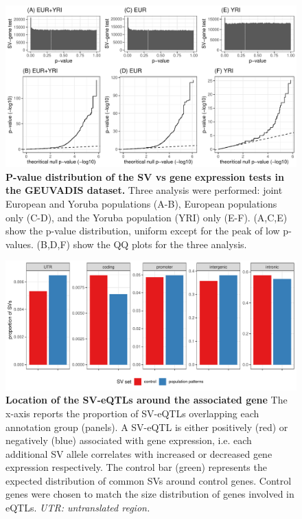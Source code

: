 \documentclass[11pt]{ucscthesis}
\begin{document}
\begin{figure}[H]
  \includegraphics[width=\linewidth]{fig-sv-eqtl.pdf}
  \caption[P-value distribution of the SV vs gene expression tests in the GEUVADIS dataset]{{\bf P-value distribution of the SV vs gene expression tests in the GEUVADIS dataset.}
    Three analysis were performed: joint European and Yoruba populations (A-B), European populations only (C-D), and the Yoruba population (YRI) only (E-F).
    (A,C,E) show the p-value distribution, uniform except for the peak of low p-values.
    (B,D,F) show the QQ plots for the three analysis.
  }
  \label{fig:eqtl_qc}
  \end{figure}

\begin{figure}[H]
  \includegraphics[width=\linewidth, page=2]{fig-sv-functional-summary.pdf}
  \caption[Location of the SV-eQTLs around the associated gene]{{\bf Location of the SV-eQTLs around the associated gene}
    The x-axis reports the proportion of SV-eQTLs overlapping each annotation group (panels).
    A SV-eQTL is either positively (red) or negatively (blue) associated with gene expression, i.e. each additional SV allele correlates with increased or decreased gene expression respectively.
    The control bar (green) represents the expected distribution of common SVs around control genes.
    Control genes were chosen to match the size distribution of genes involved in eQTLs.
    {\it UTR: untranslated region.}
  }
  \label{fig:eqtl_enr}
\end{figure}
\end{document}
